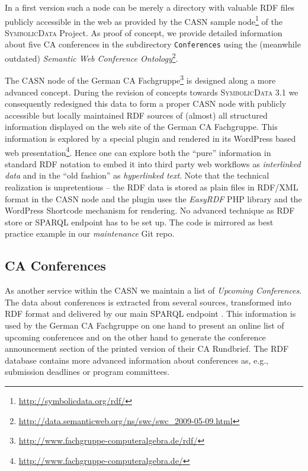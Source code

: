 \documentclass[a4paper,11pt]{article}
\def\SD{\textsc{SymbolicData}}
\begin{document}
In a first version such a node can be merely a directory with valuable RDF
files publicly accessible in the web as provided by the CASN sample
node\footnote{ \url{http://symbolicdata.org/rdf/}} of the {\SD} Project. As
proof of concept, we provide detailed information about five CA conferences in
the subdirectory \texttt{Conferences} using the (meanwhile outdated)
\emph{Semantic Web Conference Ontology}\footnote{
  \url{http://data.semanticweb.org/ns/swc/swc_2009-05-09.html}}.

The CASN node of the German CA Fachgruppe\footnote{
  \url{http://www.fachgruppe-computeralgebra.de/rdf/}} is designed along a more
advanced concept. During the revision of concepts towards {\SD} 3.1 we
consequently redesigned this data to form a proper CASN node with publicly
accessible but locally maintained RDF sources of (almost) all structured
information displayed on the web site of the German CA Fachgruppe.  This
information is explored by a special plugin and rendered in its WordPress based
web presentation\footnote{ \url{http://www.fachgruppe-computeralgebra.de/}}.
Hence one can explore both the ``pure'' information in standard RDF notation to
embed it into third party web workflows as \emph{interlinked data} and in the
``old fashion'' as \emph{hyperlinked text}.  Note that the technical
realization is unpretentious -- the RDF data is stored as plain files in
RDF/XML format in the CASN node and the plugin uses the \emph{EasyRDF} PHP
library and the WordPress Shortcode mechanism for rendering.  No advanced
technique as RDF store or SPARQL endpoint has to be set up.  The code is
mirrored as best practice example in our \emph{maintenance} Git repo.

\subsection{CA Conferences}

As another service within the CASN we maintain a list of \emph{Upcoming
  Conferences}.  The data about conferences is extracted from several sources,
transformed into RDF format and delivered by our main SPARQL endpoint
\cite{sdsparql}.  This information is used by the German CA Fachgruppe on one
hand to present an online list of upcoming conferences and on the other hand to
generate the conference announcement section of the printed version of their CA
Rundbrief.  The RDF database contains more advanced information about
conferences as, e.g., submission deadlines or program committees.
\end{document}
